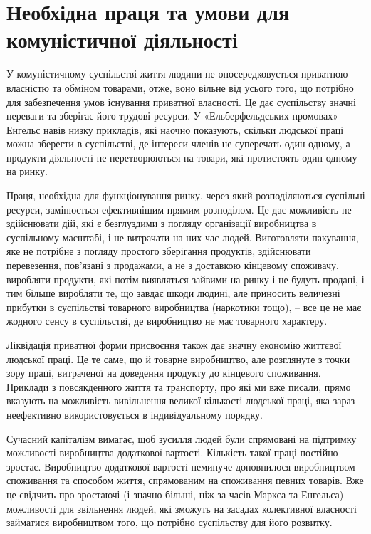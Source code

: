 \documentclass[../main]{subfiles}
\begin{document}
\ifSubfilesClassLoaded{\setcounter{page}{36}}{}
\section{Необхідна праця та умови для комуністичної діяльності}
\label{sec:06_necessitatem_truda}

У комуністичному суспільстві життя людини не опосередковується приватною власністю та обміном товарами, отже, воно вільне від усього того, що потрібно для забезпечення умов існування приватної власності. Це дає суспільству значні переваги та зберігає його трудові ресурси. У «Ельберфельдських промовах» Енгельс навів низку прикладів, які наочно показують, скільки людської праці можна зберегти в суспільстві, де інтереси членів не суперечать один одному, а продукти діяльності не перетворюються на товари, які протистоять один одному на ринку.

Праця, необхідна для функціонування ринку, через який розподіляються суспільні ресурси, замінюється ефективнішим прямим розподілом. Це дає можливість не здійснювати дій, які є безглуздими з погляду організації виробництва в суспільному масштабі, і не витрачати на них час людей. Виготовляти пакування, яке не потрібне з погляду простого зберігання продуктів, здійснювати перевезення, пов’язані з продажами, а не з доставкою кінцевому споживачу, виробляти продукти, які потім виявляться зайвими на ринку і не будуть продані, і тим більше виробляти те, що завдає шкоди людині, але приносить величезні прибутки в суспільстві товарного виробництва (наркотики тощо), – все це не має жодного сенсу в суспільстві, де виробництво не має товарного характеру.

Ліквідація приватної форми присвоєння також дає значну економію життєвої людської праці. Це те саме, що й товарне виробництво, але розглянуте з точки зору праці, витраченої на доведення продукту до кінцевого споживання. Приклади з повсякденного життя та транспорту, про які ми вже писали, прямо вказують на можливість вивільнення великої кількості людської праці, яка зараз неефективно використовується в індивідуальному порядку.

Сучасний капіталізм вимагає, щоб зусилля людей були спрямовані на підтримку можливості виробництва додаткової вартості. Кількість такої праці постійно зростає. Виробництво додаткової вартості неминуче доповнилося виробництвом споживання та способом життя, спрямованим на споживання певних товарів. Вже це свідчить про зростаючі (і значно більші, ніж за часів Маркса та Енгельса) можливості для звільнення людей, які зможуть на засадах колективної власності займатися виробництвом того, що потрібно суспільству для його розвитку.
\end{document}
